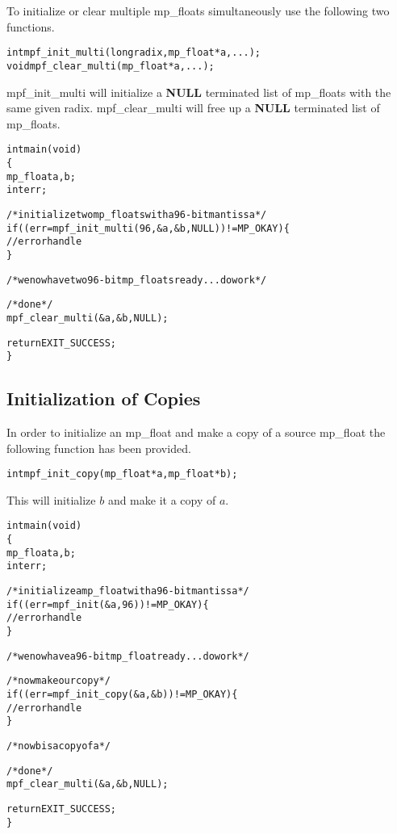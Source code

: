 \documentclass[b5paper]{book}
\begin{document}
To initialize or clear multiple mp\_floats simultaneously use the following two functions.

 
\begin{alltt}
int  mpf_init_multi(long radix, mp_float *a, ...);
void mpf_clear_multi(mp_float *a, ...);
\end{alltt}

mpf\_init\_multi will initialize a \textbf{NULL} terminated list of mp\_floats with the same given radix.  mpf\_clear\_multi will free 
up a \textbf{NULL} terminated list of mp\_floats.

\begin{alltt}
int main(void)
\{
   mp_float a, b;
   int err;

   /* initialize two mp_floats with a 96-bit mantissa */
   if ((err = mpf_init_multi(96, &a, &b, NULL)) != MP_OKAY) \{
      // error handle
   \}

   /* we now have two 96-bit mp_floats ready ... do work */

   /* done */
   mpf_clear_multi(&a, &b, NULL);

   return EXIT_SUCCESS;
\}
\end{alltt}

\subsection{Initialization of Copies}

In order to initialize an mp\_float and make a copy of a source mp\_float the following function has been provided.

\begin{alltt}
int  mpf_init_copy(mp_float *a, mp_float *b);
\end{alltt}

This will initialize $b$ and make it a copy of $a$.  

\begin{alltt}
int main(void)
\{
   mp_float a, b;
   int err;

   /* initialize a mp_float with a 96-bit mantissa */
   if ((err = mpf_init(&a, 96)) != MP_OKAY) \{
      // error handle
   \}

   /* we now have a 96-bit mp_float ready ... do work */

   /* now make our copy */
   if ((err = mpf_init_copy(&a, &b)) != MP_OKAY) \{
      // error handle
   \}

   /* now b is a copy of a */

   /* done */
   mpf_clear_multi(&a, &b, NULL);

   return EXIT_SUCCESS;
\}
\end{alltt}
\end{document}
